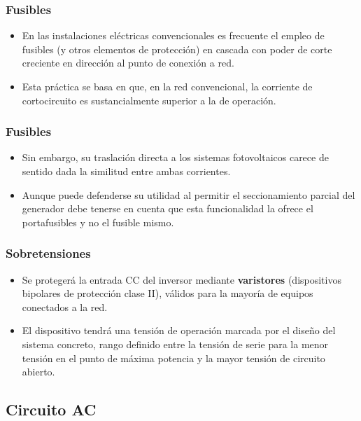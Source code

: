 \documentclass[serif, xcolor=dvipsnames]{beamer}
\begin{document}
\begin{frame}
\frametitle{Fusibles}
\begin{itemize}
\item En las instalaciones eléctricas convencionales es frecuente el empleo
de fusibles (y otros elementos de protección) en cascada con poder
de corte creciente en dirección al punto de conexión a red. 
\item Esta práctica se basa en que, en la red convencional, la corriente
de cortocircuito es sustancialmente superior a la de operación. 
\end{itemize}

\end{frame}

\begin{frame}
\frametitle{Fusibles}
\begin{itemize}
\item Sin embargo, su traslación directa a los sistemas fotovoltaicos carece
de sentido dada la similitud entre ambas corrientes. 
\item Aunque puede defenderse su utilidad al permitir el seccionamiento
parcial del generador debe tenerse en cuenta que esta funcionalidad
la ofrece el portafusibles y no el fusible mismo. 
\end{itemize}

\end{frame}

\begin{frame}
\frametitle{Sobretensiones}
\begin{itemize}
\item Se protegerá la entrada CC del inversor mediante \textbf{varistores}
(dispositivos bipolares de protección clase II), válidos para la mayoría
de equipos conectados a la red.
\item El dispositivo tendrá una tensión de operación marcada por el diseño
del sistema concreto, rango definido entre la tensión de serie para
la menor tensión en el punto de máxima potencia y la mayor tensión
de circuito abierto.
\end{itemize}

\end{frame}

\subsection{Circuito AC}
\end{document}
